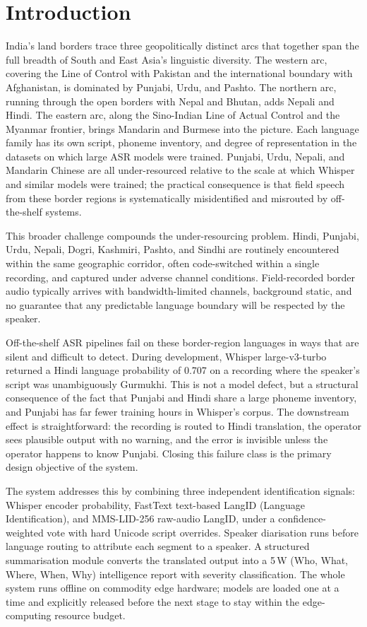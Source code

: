 \documentclass[conference]{IEEEtran}
\begin{document}
\section{Introduction}
\label{sec:intro}

India's land borders trace three geopolitically distinct arcs that together span the full breadth of South and East Asia's linguistic diversity. The western arc, covering the Line of Control with Pakistan and the international boundary with Afghanistan, is dominated by Punjabi, Urdu, and Pashto. The northern arc, running through the open borders with Nepal and Bhutan, adds Nepali and Hindi. The eastern arc, along the Sino-Indian Line of Actual Control and the Myanmar frontier, brings Mandarin and Burmese into the picture. Each language family has its own script, phoneme inventory, and degree of representation in the datasets on which large ASR models were trained. Punjabi, Urdu, Nepali, and Mandarin Chinese are all under-resourced relative to the scale at which Whisper~\cite{radford2022whisper} and similar models were trained; the practical consequence is that field speech from these border regions is systematically misidentified and misrouted by off-the-shelf systems.

This broader challenge compounds the under-resourcing problem. Hindi, Punjabi, Urdu, Nepali, Dogri, Kashmiri, Pashto, and Sindhi are routinely encountered within the same geographic corridor, often code-switched within a single recording, and captured under adverse channel conditions. Field-recorded border audio typically arrives with bandwidth-limited channels, background static, and no guarantee that any predictable language boundary will be respected by the speaker.

Off-the-shelf ASR pipelines fail on these border-region languages in ways that are silent and difficult to detect. During development, Whisper large-v3-turbo~\cite{radford2022whisper} returned a Hindi language probability of 0.707 on a recording where the speaker's script was unambiguously Gurmukhi. This is not a model defect, but a structural consequence of the fact that Punjabi and Hindi share a large phoneme inventory, and Punjabi has far fewer training hours in Whisper's corpus. The downstream effect is straightforward: the recording is routed to Hindi translation, the operator sees plausible output with no warning, and the error is invisible unless the operator happens to know Punjabi. Closing this failure class is the primary design objective of the system.

The system addresses this by combining three independent identification signals: Whisper encoder probability, FastText text-based LangID (Language Identification), and MMS-LID-256 raw-audio LangID, under a confidence-weighted vote with hard Unicode script overrides. Speaker diarisation runs before language routing to attribute each segment to a speaker. A structured summarisation module converts the translated output into a 5\,W (Who, What, Where, When, Why) intelligence report with severity classification. The whole system runs offline on commodity edge hardware; models are loaded one at a time and explicitly released before the next stage to stay within the edge-computing resource budget.
\end{document}

